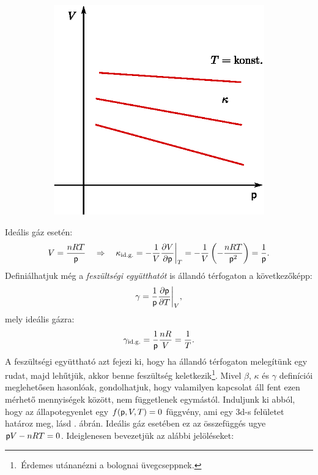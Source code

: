 \begin{figure}[!h]
\begin{subfigure}[b]{0.45\textwidth}
            \includegraphics[width=\textwidth]{termo_2/termo_2_4}
            \label{fig:termo_2_4}
    \end{subfigure}
    \end{figure}
Ideális gáz esetén:
\begin{align}
    V = \frac{nRT}{\mathsf p} \quad\Rightarrow\quad \kappa_{\textnormal{id.g.}} = -\frac{1}{V} \frac{\partial{V}}{\partial{\mathsf p}}\bigg|_T = -\frac{1}{V} \left({-\frac{nRT}{\mathsf p^2}}\right)= \frac{1}{\mathsf p}.
\end{align}
Definiálhatjuk még a \emph{feszültségi együtthatót} is állandó térfogaton a következőképp:
\begin{align}
    \gamma = \frac{1}{\mathsf p} \frac{\partial{\mathsf p}}{\partial{T}}\bigg|_V,
\end{align}
mely ideális gázra:
\begin{align}
    \gamma_{\textnormal{id.g.}} = \frac{1}{\mathsf p}\frac{nR}{V} = \frac{1}{T}.
\end{align}
A feszültségi együttható azt fejezi ki, hogy ha állandó térfogaton melegítünk egy rudat, majd lehűtjük, akkor benne feszültség keletkezik\footnote{\,Érdemes utánanézni a bolognai üvegcseppnek.}.
Mivel $\beta$, $\kappa$ és $\gamma$ definíciói meglehetősen hasonlóak, gondolhatjuk, hogy valamilyen kapcsolat áll fent ezen mérhető mennyiségek között, nem függetlenek egymástól. Induljunk ki abból, hogy az állapotegyenlet egy $f(\mathsf p,V,T)=0$ függvény, ami egy 3d-s felületet határoz meg, lásd . ábrán. Ideális gáz esetében ez az összefüggés ugye $\mathsf p V-nRT=0$. Ideiglenesen bevezetjük az alábbi jelöléseket:
